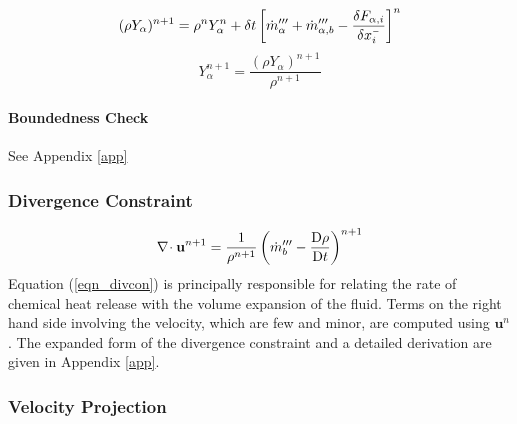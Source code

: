 \documentclass[11pt]{article}
\begin{document}
\begin{equation}
\label{eqn_densityupdate}
(\rho Y_\alpha)^{n+1} = \rho^n Y_\alpha^n + \delta t \left[\dot{m}_\alpha^{\prime\prime\prime} + \dot{m}_{\alpha,b}^{\prime\prime\prime} - \frac{\delta F_{\alpha,i}}{\delta x_i^{\scriptscriptstyle -}} \right]^n
\end{equation}
\begin{equation}
Y_\alpha^{n+1} = \frac{(\rho Y_\alpha)^{n+1}}{\rho^{n+1}}
\end{equation}

\paragraph{Boundedness Check} See Appendix \ref{app}

\subsubsection{Divergence Constraint}

\begin{equation}
\label{eqn_divcon}
{\nabla\!\cdot\mathbf{u}}^{n+1} = \frac{1}{\rho^{n+1}}\left(\dot{m}_b^{\prime\prime\prime} - \frac{\mbox{D}\rho}{\mbox{D}t}\right)^{n+1}
\end{equation}
Equation (\ref{eqn_divcon}) is principally responsible for relating the rate of chemical heat release with the volume expansion of the fluid.  Terms on the right hand side involving the velocity, which are few and minor, are computed using $\mathbf{u}^n$.  The expanded form of the divergence constraint and a detailed derivation are given in Appendix \ref{app}.

\subsubsection{Velocity Projection}
\end{document}
